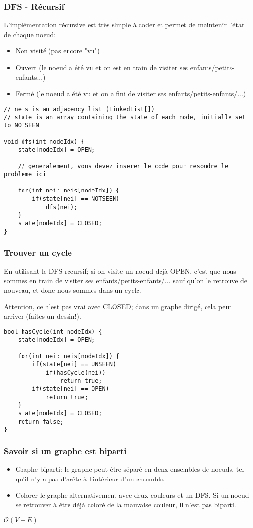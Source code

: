 \documentclass[8pt,aspectratio=169]{beamer}
\begin{document}
\begin{frame}[fragile]
\frametitle{DFS - Récursif}
L'implémentation récursive est très simple à coder et permet de maintenir l'état de chaque noeud:
\begin{itemize}
	\item Non visité (pas encore "vu")
	\item Ouvert (le noeud a été vu et on est en train de visiter ses enfants/petits-enfants...)
	\item Fermé (le noeud a été vu et on a fini de visiter ses enfants/petits-enfants/...)
\end{itemize}

\begin{lstlisting}
// neis is an adjacency list (LinkedList[])
// state is an array containing the state of each node, initially set to NOTSEEN

void dfs(int nodeIdx) {
	state[nodeIdx] = OPEN;
	
	// generalement, vous devez inserer le code pour resoudre le probleme ici
	
	for(int nei: neis[nodeIdx]) {
		if(state[nei] == NOTSEEN)
			dfs(nei);
	}
	state[nodeIdx] = CLOSED;
}
\end{lstlisting}
\end{frame}

\begin{frame}[fragile]
\frametitle{Trouver un cycle}
En utilisant le DFS récursif; si on visite un noeud déjà OPEN, c'est que nous sommes en train de visiter ses enfants/petits-enfants/... sauf qu'on le retrouve de nouveau, et donc nous sommes dans un cycle.

Attention, ce n'est pas vrai avec CLOSED; dans un graphe dirigé, cela peut arriver (faites un dessin!).

\begin{lstlisting}
bool hasCycle(int nodeIdx) {
	state[nodeIdx] = OPEN;

	for(int nei: neis[nodeIdx]) {
		if(state[nei] == UNSEEN)
			if(hasCycle(nei))
				return true;
		if(state[nei] == OPEN)
			return true;
	}
	state[nodeIdx] = CLOSED;
	return false;
}
\end{lstlisting}
\end{frame}

\begin{frame}
\frametitle{Savoir si un graphe est biparti}
\begin{itemize}
	\item Graphe biparti: le graphe peut être séparé en deux ensembles de noeuds, tel qu'il n'y a pas d'arête à l'intérieur d'un ensemble.
	\item Colorer le graphe alternativement avec deux couleurs et un DFS. Si un noeud se retrouver à être déjà coloré de la mauvaise couleur, il n'est pas biparti.
\end{itemize}
$\mathcal{O}(V+E)$
\end{frame}
\end{document}
